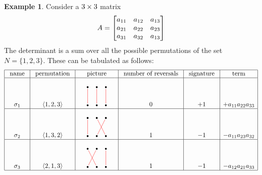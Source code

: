 \documentclass[reqno]{amsart}
\theoremstyle{definition}
\newtheorem{example}[theorem]{Example}
\begin{document}
\begin{example}\label{eg-det-three}
 Consider a $3\times 3$ matrix
 \[ A =
     \left[\begin{matrix}
      a_{11} & a_{12} & a_{13} \\
      a_{21} & a_{22} & a_{23} \\
      a_{31} & a_{32} & a_{13}
     \end{matrix}\right]
 \]
 The determinant is a sum over all the possible permutations of the
 set $N=\{1,2,3\}$.  These can be tabulated as follows:
 \[
  \begin{array}{|c|c|c|c|c|c|} \hline
   \text{ name } &
   \text{ permutation } &
   \text{ picture } &
   \text{ number of reversals } &
   \text{ signature } &
   \text{ term } \\ \hline
   \sg_1 &
   \ip{1,2,3} &
   \begin{tikzpicture}[scale=0.5]
    \draw[white] (0,0) -- (4,3);
    \fill (1,2) circle(0.1);
    \fill (2,2) circle(0.1);
    \fill (3,2) circle(0.1);
    \fill (1,0) circle(0.1);
    \fill (2,0) circle(0.1);
    \fill (3,0) circle(0.1);
    \draw[red,shorten >=1mm,shorten <=1mm] (1,2) -- (1,0);
    \draw[red,shorten >=1mm,shorten <=1mm] (2,2) -- (2,0);
    \draw[red,shorten >=1mm,shorten <=1mm] (3,2) -- (3,0);
   \end{tikzpicture} &
   0 &
   +1 &
   +a_{11}a_{22}a_{33}
   \\ \hline
   \sg_2 &
   \ip{1,3,2} &
   \begin{tikzpicture}[scale=0.5]
    \draw[white] (0,0) -- (4,3);
    \fill (1,2) circle(0.1);
    \fill (2,2) circle(0.1);
    \fill (3,2) circle(0.1);
    \fill (1,0) circle(0.1);
    \fill (2,0) circle(0.1);
    \fill (3,0) circle(0.1);
    \draw[red,shorten >=1mm,shorten <=1mm] (1,2) -- (1,0);
    \draw[red,shorten >=1mm,shorten <=1mm] (2,2) -- (3,0);
    \draw[red,shorten >=1mm,shorten <=1mm] (3,2) -- (2,0);
   \end{tikzpicture} &
   1 &
   -1 &
   - a_{11}a_{23}a_{32}
   \\ \hline
   \sg_3 &
   \ip{2,1,3} &
   \begin{tikzpicture}[scale=0.5]
    \draw[white] (0,0) -- (4,3);
    \fill (1,2) circle(0.1);
    \fill (2,2) circle(0.1);
    \fill (3,2) circle(0.1);
    \fill (1,0) circle(0.1);
    \fill (2,0) circle(0.1);
    \fill (3,0) circle(0.1);
    \draw[red,shorten >=1mm,shorten <=1mm] (1,2) -- (2,0);
    \draw[red,shorten >=1mm,shorten <=1mm] (2,2) -- (1,0);
    \draw[red,shorten >=1mm,shorten <=1mm] (3,2) -- (3,0);
   \end{tikzpicture} &
   1 &
   -1 &
   - a_{12}a_{21}a_{33}
   \\ \hline

\end{array}\]
\end{example}
\end{document}
